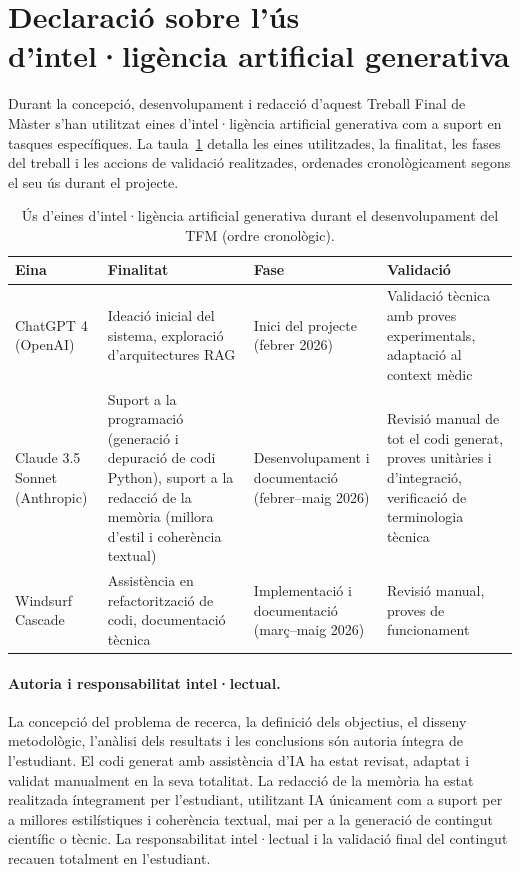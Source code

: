 \documentclass[CAT]{TFUOC}%
\begin{document}
\section{Declaració sobre l’ús d’intel·ligència artificial generativa}

Durant la concepció, desenvolupament i redacció d'aquest Treball Final de Màster s'han utilitzat eines d'intel·ligència artificial generativa com a suport en tasques específiques. La taula~\ref{tab:ia-usage} detalla les eines utilitzades, la finalitat, les fases del treball i les accions de validació realitzades, ordenades cronològicament segons el seu ús durant el projecte.

\begin{table}[H]
\centering
\small
\begin{tabular}{p{3cm}p{3.5cm}p{2.5cm}p{4cm}}
\hline
\textbf{Eina} & \textbf{Finalitat} & \textbf{Fase} & \textbf{Validació} \\
\hline
ChatGPT 4 (OpenAI) & Ideació inicial del sistema, exploració d'arquitectures RAG & Inici del projecte (febrer 2026) & Validació tècnica amb proves experimentals, adaptació al context mèdic \\
\hline
Claude 3.5 Sonnet (Anthropic) & Suport a la programació (generació i depuració de codi Python), suport a la redacció de la memòria (millora d'estil i coherència textual) & Desenvolupament i documentació (febrer--maig 2026) & Revisió manual de tot el codi generat, proves unitàries i d'integració, verificació de terminologia tècnica \\
\hline
Windsurf Cascade & Assistència en refactorització de codi, documentació tècnica & Implementació i documentació (març--maig 2026) & Revisió manual, proves de funcionament \\
\hline
\end{tabular}
\caption{Ús d'eines d'intel·ligència artificial generativa durant el desenvolupament del TFM (ordre cronològic).}
\label{tab:ia-usage}
\end{table}

\paragraph{Autoria i responsabilitat intel·lectual.}
La concepció del problema de recerca, la definició dels objectius, el disseny metodològic, l'anàlisi dels resultats i les conclusions són autoria íntegra de l'estudiant. El codi generat amb assistència d'IA ha estat revisat, adaptat i validat manualment en la seva totalitat. La redacció de la memòria ha estat realitzada íntegrament per l'estudiant, utilitzant IA únicament com a suport per a millores estilístiques i coherència textual, mai per a la generació de contingut científic o tècnic. La responsabilitat intel·lectual i la validació final del contingut recauen totalment en l'estudiant.
\end{document}
